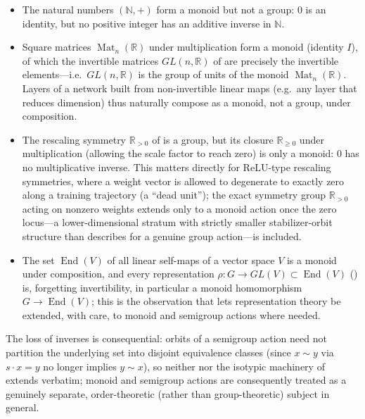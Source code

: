 \documentclass[mathematics,review,submit,moreauthors]{Definitions/mdpi}
\begin{document}
\begin{Example}
\label{ex:semigroups-in-learning}
\begin{itemize}
    \item The natural numbers $(\mathbb{N}, +)$ form a monoid but not a
    group: $0$ is an identity, but no positive integer has an additive
    inverse in $\mathbb{N}$.
    \item Square matrices $\operatorname{Mat}_n(\mathbb{R})$ under multiplication
    form a monoid (identity $I$), of which the invertible matrices
    $GL(n,\mathbb{R})$ of  are precisely the
    invertible elements---i.e.\ $GL(n,\mathbb{R})$ is the group of units of
    the monoid $\operatorname{Mat}_n(\mathbb{R})$. Layers of a network built from
    non-invertible linear maps (e.g.\ any layer that reduces dimension) thus
    naturally compose as a monoid, not a group, under composition.
    \item The rescaling symmetry $\mathbb{R}_{>0}$ of
     is a group, but its closure
    $\mathbb{R}_{\geq 0}$ under multiplication (allowing the scale factor to
    reach zero) is only a monoid: $0$ has no multiplicative inverse. This
    matters directly for ReLU-type rescaling symmetries, where a weight
    vector is allowed to degenerate to exactly zero along a training
    trajectory (a ``dead unit''); the exact symmetry group
    $\mathbb{R}_{>0}$ acting on nonzero weights extends only to a
    monoid action once the zero locus---a lower-dimensional stratum with
    strictly smaller stabilizer-orbit structure than
     describes for a genuine group
    action---is included.
    \item The set $\operatorname{End}(V)$ of all linear self-maps of a vector
    space $V$ is a monoid under composition, and every representation
    $\rho: G \to GL(V) \subset \operatorname{End}(V)$
    () is, forgetting
    invertibility, in particular a monoid homomorphism $G \to
    \operatorname{End}(V)$; this is the observation that lets representation
    theory be extended, with care, to monoid and semigroup actions where
    needed.
\end{itemize}
\end{Example}

The loss of inverses is consequential: orbits of a semigroup action need not
partition the underlying set into disjoint equivalence classes (since
$x \sim y$ via $s \cdot x = y$ no longer implies $y \sim x$), so neither
 nor the isotypic machinery of
 extends verbatim; monoid and
semigroup actions are consequently treated as a genuinely separate,
order-theoretic (rather than group-theoretic) subject in general.
\end{document}
